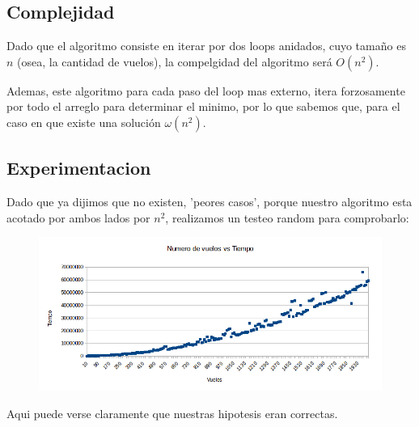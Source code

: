 \subsection{Complejidad}

Dado que el algoritmo consiste en iterar por dos loops anidados, cuyo tamaño es $n$ (osea, la cantidad de vuelos), la compelgidad del algoritmo será $O(n^2)$.

Ademas, este algoritmo para cada paso del loop mas externo, itera forzosamente por todo el arreglo para determinar el minimo, por lo que sabemos que, para el caso en que existe una solución $\omega (n^2)$.

\newpage

\subsection{Experimentacion}

Dado que ya dijimos que no existen, 'peores casos', porque nuestro algoritmo esta acotado por ambos lados por $n^2$, realizamos un testeo random para comprobarlo:

\begin{figure}[h!]
  \begin{center}
	\includegraphics[scale=0.5]{Ej1/testingnvst.png}
	\label{nombreparareferenciar}
  \end{center}
\end{figure}

Aqui puede verse claramente que nuestras hipotesis eran correctas.
